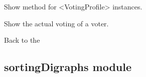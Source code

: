 \documentclass[letterpaper,10pt,english]{sphinxmanual}
\begin{document}
\begin{fulllineitems}
\begin{fulllineitems}
\label{techDoc:votingDigraphs.VotingProfile.showAll}
Show method for \textless{}VotingProfile\textgreater{} instances.

\end{fulllineitems}


\begin{fulllineitems}
\label{techDoc:votingDigraphs.VotingProfile.showVoterBallot}
Show the actual voting of a voter.

\end{fulllineitems}


\end{fulllineitems}


Back to the {\hyperref[techDoc:technical-label]{\emph{}}}


\subsection{sortingDigraphs module}
\label{techDoc:sortingdigraphs-module}\label{techDoc:sortingdigraphs-label}\label{techDoc:module-sortingDigraphs}
\end{document}
